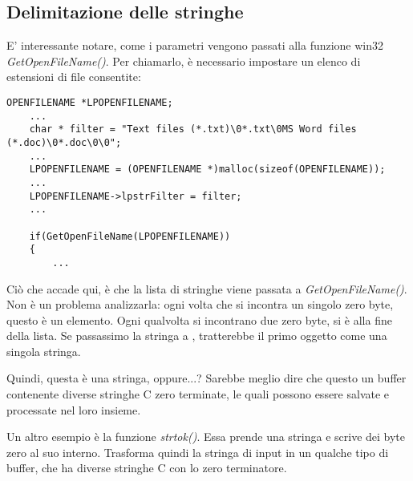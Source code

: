 \subsection{Delimitazione delle stringhe}

E' interessante notare, come i parametri vengono passati alla funzione win32 \emph{GetOpenFileName()}.
Per chiamarlo, è necessario impostare un elenco di estensioni di file consentite:

\begin{lstlisting}[style=customc]
	OPENFILENAME *LPOPENFILENAME;
	...
	char * filter = "Text files (*.txt)\0*.txt\0MS Word files (*.doc)\0*.doc\0\0";
	...
	LPOPENFILENAME = (OPENFILENAME *)malloc(sizeof(OPENFILENAME));
	...
	LPOPENFILENAME->lpstrFilter = filter;
	...

	if(GetOpenFileName(LPOPENFILENAME))
	{
		...
\end{lstlisting}

Ciò che accade qui, è che la lista di stringhe viene passata a \emph{GetOpenFileName()}.
Non è un problema analizzarla: ogni volta che si incontra un singolo zero byte, questo è un elemento.
Ogni qualvolta si incontrano due zero byte, si è alla fine della lista.
Se passassimo la stringa a \printf, tratterebbe il primo oggetto come una singola stringa.

Quindi, questa è una stringa, oppure...?
Sarebbe meglio dire che questo un buffer contenente diverse stringhe C zero terminate, le quali possono essere salvate e processate
nel loro insieme.

Un altro esempio è la funzione \emph{strtok()}. Essa prende una stringa e scrive dei byte zero al suo interno.
Trasforma quindi la stringa di input in un qualche tipo di buffer, che ha diverse stringhe C con lo zero terminatore.
